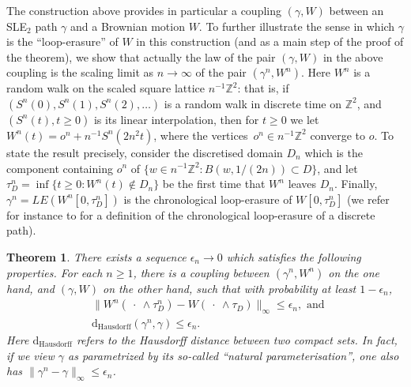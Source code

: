 \documentclass[11pt]{article}
\newtheorem{theorem}{Theorem}[section]
\def\Z{{\mathbb Z}}
\begin{document}
\medskip The construction above provides in particular a coupling $(\gamma, W)$ between an SLE$_2$ path $\gamma$ and a Brownian motion $W$. To further illustrate the sense in which $\gamma$ is the ``loop-erasure'' of $W$ in this construction (and as a main step of the proof of the theorem), we show that actually the law of the pair $(\gamma, W)$ in the above coupling is the scaling limit as $n\to \infty$ of the pair $(\gamma^n, W^n)$. Here $W^n$ is a random walk on the scaled square lattice $n^{-1} \Z^2$: that is, if $(S^n(0), S^n(1), S^n(2), \ldots)$ is a random walk in discrete time on $\Z^2$, and $(S^n (t), t \ge 0)$ is its linear interpolation, then for $t\ge 0$ we let $W^n(t) = o^n + n^{-1} S^n (  2n^2 t )$, where the vertices~$o^n\in n^{-1} \Z^2$  converge to $o$. To state the result precisely,
consider the discretised domain $D_n $ which is the component containing $o^n$ of $\{w \in n^{-1} \Z^2: B(w, 1/(2n)) \subset D\}$, and let $\tau_D^n = \inf \{ t\ge 0: W^n(t) \notin D_n\}$ be the first time that $W^n$ leaves $D_n$. Finally, $\gamma^n = LE (W^n[0, \tau^n_D]) $ is the chronological loop-erasure of $W[0, \tau_D^n]$ (we refer for instance to \cite{LawlerLimic} for a definition of the chronological loop-erasure of a discrete path).

\begin{theorem}
There exists a sequence $\epsilon_n\to 0$ which satisfies the following properties.
For each $n \ge 1$, there is a coupling between $(\gamma^n, W^n)$ on the one hand, and $(\gamma, W)$ on the other hand, such that with probability at least $1-\epsilon_n$,
\begin{align*}
&\| W^n (\ \cdot \ \wedge \tau^n_D) - W
 (\  \cdot \ \wedge \tau_D)\|_\infty  \le \epsilon_n, \text{ and }\\
& \mathrm{d}_{\mathrm{Hausdorff}} (\gamma^n , \gamma)  \le \epsilon_n.
\end{align*}
Here $\mathrm{d}_{\mathrm{Hausdorff}}$ refers to the Hausdorff distance between two compact sets. In fact, if we view $\gamma$ as parametrized by its so-called ``natural parameterisation'', one also has $\| \gamma^n - \gamma\|_\infty \le \epsilon_n$.
\end{theorem}
\end{document}
